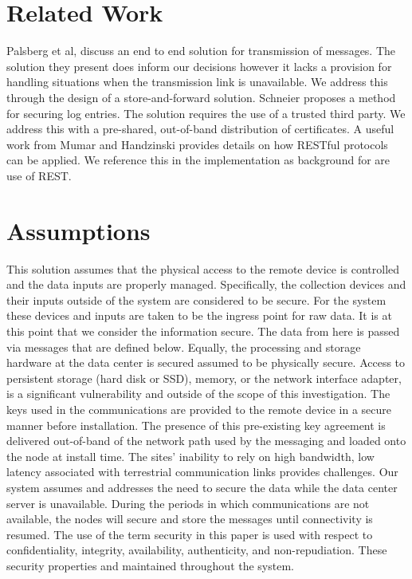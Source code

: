 \section{Related Work}
Palsberg et al, \cite{Palsberg:1997ts} discuss an end to end solution for transmission of messages. The solution they present does inform our decisions however it lacks a provision for handling situations when the transmission link is unavailable. We address this through the design of a store-and-forward solution.
Schneier \cite{Schneier:1999fu} proposes a method for securing log entries. The solution requires the use of a trusted third party. We address this with a pre-shared, out-of-band distribution of certificates.
A useful work from Mumar and Handzinski\cite{Kumar:2012vg} provides details on how RESTful protocols can be applied. We reference this in the implementation as background for are use of REST.
\section{Assumptions}
This solution assumes that the physical access to the remote device is controlled and the data inputs are properly managed. Specifically, the collection devices and their inputs outside of the system are considered to be secure. For the system these devices and inputs are taken to be the ingress point for raw data. It is at this point that we consider the information secure. The data from here is passed via messages that are defined below. Equally, the processing and storage hardware at the data center is secured assumed to be physically secure. Access to persistent storage (hard disk or SSD), memory, or the network interface adapter, is a significant vulnerability and outside of the scope of this investigation. 
The keys used in the communications are provided to the remote device in a secure manner before installation. The presence of this pre-existing key agreement is delivered out-of-band of the network path used by the messaging and loaded onto the node at install time. 
The sites’ inability to rely on high bandwidth, low latency associated with terrestrial communication links provides challenges. Our system assumes and addresses the need to secure the data while the data center server is unavailable. During the periods in which communications are not available, the nodes will secure and store the messages until connectivity is resumed.
     The use of the term security in this paper is used with respect to confidentiality, integrity, availability, authenticity, and non-repudiation. These security properties and maintained throughout the system.
     
